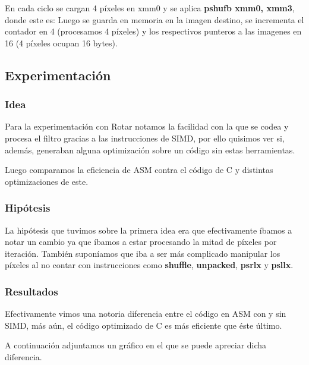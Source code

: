 En cada ciclo se cargan 4 píxeles en xmm0 y se aplica \textbf{pshufb xmm0, xmm3}, donde este es:
Luego se guarda en memoria en la imagen destino, se incrementa el contador en 4 (procesamos 4 píxeles) y los respectivos punteros a las imagenes en 16 (4 píxeles ocupan 16 bytes).	
	
	
\subsection{Experimentación}

\subsubsection{Idea}	
\par{Para la experimentación con Rotar notamos la facilidad con la que se codea y procesa el filtro gracias a las instrucciones de SIMD, por ello quisimos ver si, además, generaban alguna optimización sobre un código sin estas herramientas.}
\par{Luego comparamos la eficiencia de ASM contra el código de C y distintas optimizaciones de este.}

\subsubsection{Hipótesis}
\par{La hipótesis que tuvimos sobre la primera idea era que efectivamente íbamos a notar un cambio ya que íbamos a estar procesando la mitad de píxeles por iteración. También suponíamos que iba a ser más complicado manipular los píxeles al no contar con instrucciones como \textbf{shuffle}, \textbf{unpacked}, \textbf{psrlx} y \textbf{psllx}.}
	
\subsubsection{Resultados}
\par{Efectivamente vimos una notoria diferencia entre el código en ASM con y sin SIMD, más aún, el código optimizado de C es más eficiente que éste último.}
\par{A continuación adjuntamos un gráfico en el que se puede apreciar dicha diferencia.}
	
